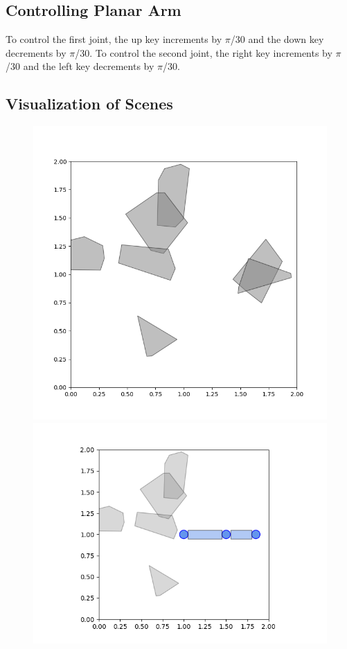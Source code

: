 \documentclass{article}
\begin{document}
\subsection{Controlling Planar Arm}
To control the first joint, the up key increments by $\pi$/30 and the down key decrements by $\pi$/30. To control the second joint, the right key increments by $\pi$/30 and the left key decrements by $\pi$/30.
\subsection{Visualization of Scenes}

\begin{figure}[htbp]
  \centering
  \begin{minipage}{0.45\textwidth}
    \includegraphics[width=\linewidth]{part4_without_arm.png}
  \end{minipage}\hfill
  \begin{minipage}{0.45\textwidth}
    \includegraphics[width=\linewidth]{part4_with_arm.png}

\end{minipage}
\end{figure}
\end{document}
